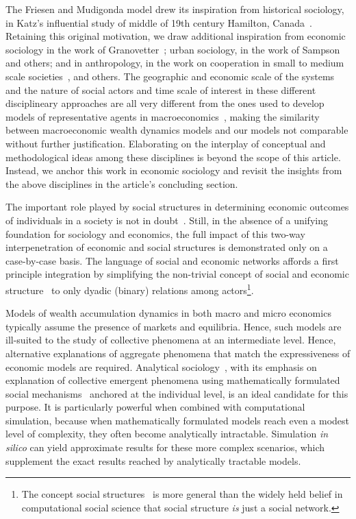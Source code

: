 The Friesen and Mudigonda model drew its inspiration from historical sociology, in Katz's influential study of middle of 19th century Hamilton, Canada~\cite{katz2013people}. Retaining this original motivation, we draw additional inspiration from economic sociology in the work of Granovetter~\cite{granovetter2005}; urban sociology, in the work of Sampson~\cite{sampson2002} and others; and in anthropology, in the work on cooperation in small to medium scale societies~\cite{avner1994,white2011kinship}, and others. The geographic and economic scale of the systems and the nature of social actors and time scale of interest in these different disciplineary approaches are all very different from the ones used to develop models of representative agents in macroeconomics~\cite{benhabib2018}, making the similarity between macroeconomic wealth dynamics models and our models not comparable without further justification. Elaborating on the interplay of conceptual and methodological ideas among these disciplines is beyond the scope of this article. Instead, we anchor this work in economic sociology and revisit the insights from the above disciplines in the article's concluding section.

The important role played by social structures in determining economic outcomes of individuals in a society is not in doubt~\cite{granovetter2005, jackson_rev2017}. Still, in the absence of a unifying foundation for sociology and economics, the full impact of this two-way interpenetration of economic and social structures is demonstrated only on a case-by-case basis. The language of social and economic networks affords a first principle integration by simplifying the non-trivial concept of social and economic structure~\cite{martin_lee} to only dyadic (binary) relations among actors\footnote{The concept social structures~\cite{martin_lee} is more general than the widely held belief in computational social science that social structure \textit{is} just a social network.}. 

Models of wealth accumulation dynamics in both macro and micro economics typically assume the presence of markets and equilibria. Hence, such models are ill-suited to the study of collective phenomena at an intermediate level. Hence, alternative explanations of aggregate phenomena that match the expressiveness of economic models are required. Analytical sociology~\cite{ch1as_hdbk}, with its emphasis on explanation of collective emergent phenomena using mathematically formulated social mechanisms~\cite{ch2as_hdbk,ch11as_hdbk} anchored at the individual level, is an ideal candidate for this purpose. It is particularly powerful when combined with computational simulation, because when mathematically formulated models reach even a modest level of complexity, they often become analytically intractable. Simulation \textit{in silico} can yield approximate results for these more complex scenarios, which supplement the exact results reached by analytically tractable models. 

